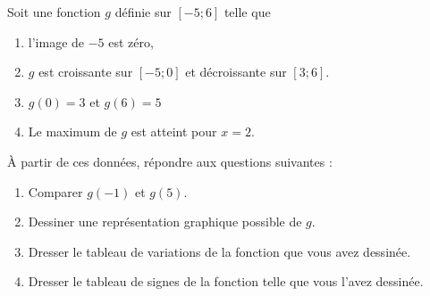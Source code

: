 
\begin{exercice}[\ldots/6]\label{exosmath-0631}

    Soit une fonction \( g\) définie sur \( [-5;6]\) telle que
    \begin{enumerate}
        \item
            l'image de \( -5\) est zéro,
        \item
            \( g\) est croissante sur \( [-5;0]\) et décroissante sur \( [3;6]\).
        \item
            \( g(0)=3\) et \( g(6)=5\)
        \item
            Le maximum de \( g\) est atteint pour \( x=2\).
    \end{enumerate}
    À partir de ces données, répondre aux questions suivantes :
    \begin{enumerate}
        \item
            Comparer \( g(-1)\) et \( g(5)\).
        \item
            Dessiner une représentation graphique possible de \( g\).
        \item
            Dresser le tableau de variations de la fonction que vous avez dessinée.
        \item
            Dresser le tableau de signes de la fonction telle que vous l'avez dessinée.
    \end{enumerate}

\end{exercice}
